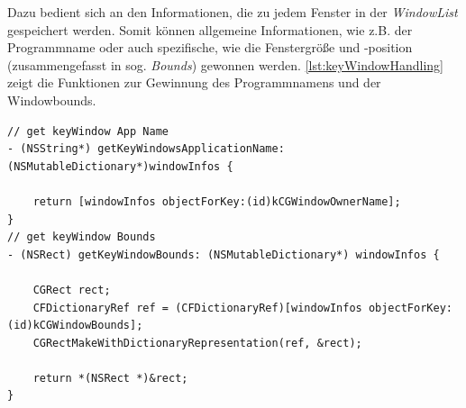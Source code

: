 Dazu bedient sich \scribbler an den Informationen, die zu jedem Fenster in der \emph{WindowList} gespeichert werden. Somit können allgemeine Informationen, wie z.B. der Programmname oder auch spezifische, wie die Fenstergröße und -position (zusammengefasst in sog. \emph{Bounds}) gewonnen werden. \autoref{lst:keyWindowHandling} zeigt die Funktionen zur Gewinnung des Programmnamens und der Windowbounds.

\begin{lstlisting}[float,caption=Key Window Handling,label=lst:keyWindowHandling]
// get keyWindow App Name
- (NSString*) getKeyWindowsApplicationName: (NSMutableDictionary*)windowInfos {
	
    return [windowInfos objectForKey:(id)kCGWindowOwnerName];
}
// get keyWindow Bounds
- (NSRect) getKeyWindowBounds: (NSMutableDictionary*) windowInfos {
	
    CGRect rect;
    CFDictionaryRef ref = (CFDictionaryRef)[windowInfos objectForKey:(id)kCGWindowBounds];
    CGRectMakeWithDictionaryRepresentation(ref, &rect);

    return *(NSRect *)&rect;
}
\end{lstlisting}

